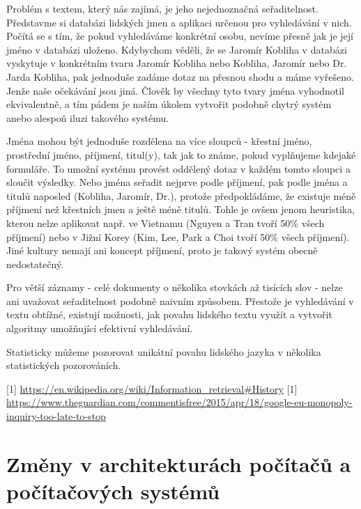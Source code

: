 \documentclass[11pt,letterpaper,oneside,openright]{book}
\begin{document}
Problém s textem, který nás zajímá, je jeho nejednoznačná seřaditelnost.
Představme si databázi lidských jmen a aplikaci určenou pro vyhledávání v nich.
Počítá se s tím, že pokud vyhledáváme konkrétní osobu, nevíme přesně jak je
její jméno v databázi uloženo. Kdybychom věděli, že se Jaromír Kobliha v
databázi vyskytuje v konkrétním tvaru Jaromír Kobliha nebo Kobliha, Jaromír
nebo Dr. Jarda Kobliha, pak jednoduše zadáme dotaz na přesnou shodu a máme
vyřešeno. Jenže naše očekávání jsou jiná. Člověk by všechny tyto tvary jména
vyhodnotil ekvivalentně, a tím pádem je naším úkolem vytvořit podobně chytrý
systém anebo alespoň iluzi takového systému.

Jména mohou být jednoduše rozdělena na více sloupců - křestní jméno, prostřední
jméno, příjmení, titul(y), tak jak to známe, pokud vyplňujeme kdejaké
formuláře. To umožní systému provést oddělený dotaz v každém tomto sloupci a
sloučit výsledky. Nebo jména seřadit nejprve podle příjmení, pak podle jména a
titulů naposled (Kobliha, Jaromír, Dr.), protože předpokládáme, že existuje
méně příjmení než křestních jmen a ještě méně titulů. Tohle je ovšem jenom
heuristika, kterou nelze aplikovat např. ve Vietnamu (Nguyen a Tran tvoří 50\%
všech příjmení) nebo v Jižní Korey (Kim, Lee, Park a Choi tvoří 50\% všech
příjmení). Jiné kultury nemají ani koncept příjmení, proto je takový systém
obecně nedostatečný.

Pro větší záznamy - celé dokumenty o několika stovkách až tisících slov - nelze
ani uvažovat seřaditelnost podobně naivním způsobem. Přestože je vyhledávání v
textu obtížné, existují možnosti, jak povahu lidského textu využít a vytvořit
algoritmy umožňující efektivní vyhledávání.

Statisticky můžeme pozorovat unikátní povahu lidského jazyka v několika statistických pozorováních.

[1] \url{https://en.wikipedia.org/wiki/Information_retrieval#History}
[1] \url{https://www.theguardian.com/commentisfree/2015/apr/18/google-eu-monopoly-inquiry-too-late-to-stop}


\section{Změny v architekturách počítačů a počítačových systémů}
\end{document}
